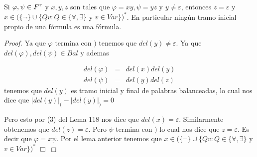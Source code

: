   \begin{proposition} \label{lemma_40}
    \PN Si $\varphi, \psi \in F^{\tau}$ y $x, y, z$ son tales que $\varphi = xy, \psi = yz$ y $y \neq \varepsilon$, entonces
    $z = \varepsilon$ y $x \in (\{\lnot\} \cup \{Qv: Q \in \{\forall, \exists\}$ y $v \in Var\})^{\ast}$. En particular
    ningún tramo inicial propio de una fórmula es una fórmula.
  \end{proposition}
  \begin{proof}
    Ya que $\varphi $ termina con $)$ tenemos que $del(y)\neq \varepsilon .$ Ya que $del(\varphi ),del(\psi )\in Bal$ y ademas

    \begin{eqnarray*}
      del(\varphi) &=& del(x)del(y) \\
      del(\psi) &=& del(y)del(z)
    \end{eqnarray*}
    \PN tenemos que $del(y)$ es tramo inicial y final de palabras balanceadas, lo cual nos dice que
    $\displaystyle \lvert del(y)\rvert_{(}-\lvert del(y)\rvert_{)}=0 $

    Pero esto por (3) del Lema 118 nos dice que $ del(x)=\varepsilon $. Similarmente obtenemos que $del(z)=\varepsilon $. Pero $\psi $ termina con $)$ lo cual nos dice que $z=\varepsilon $. Es decir que $ \varphi =x\psi $. Por el lema anterior tenemos que $x\in (\{\lnot \}\cup \{Qv:Q\in \{\forall ,\exists \}$ y $v\in Var\})^{\ast }$ $\Box$
  \end{proof}

